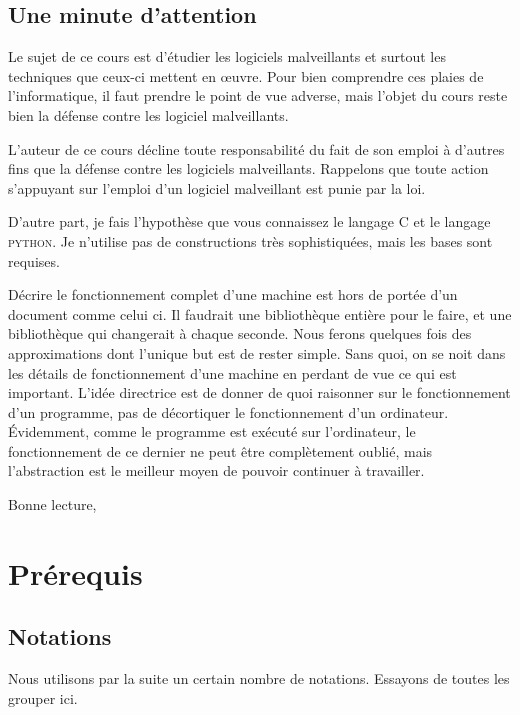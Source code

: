 \documentclass{book}
\newcommand{\python}{\textsc{python}\xspace}
\newcommand{\C}{\textsc{C}\xspace}
\begin{document}
	
\section*{Une minute d'attention}

Le sujet de ce cours est d'étudier les logiciels malveillants et surtout les techniques que ceux-ci mettent en \oe uvre. Pour bien comprendre ces plaies de l'informatique, il faut prendre le point de vue adverse, mais l'objet du cours reste bien la défense contre les logiciel malveillants. 

L'auteur de ce cours décline toute responsabilité du fait de son emploi à d'autres fins que la défense contre les logiciels malveillants. Rappelons que toute action s'appuyant sur l'emploi d'un logiciel malveillant est punie par la loi. 

D'autre part, je fais l'hypothèse que vous connaissez le langage \C et le langage \python. Je n'utilise pas de constructions très sophistiquées, mais les bases sont requises.

Décrire le fonctionnement complet d'une machine est hors de portée d'un document comme celui ci. Il faudrait une bibliothèque entière pour le faire, et une bibliothèque qui changerait à chaque seconde. Nous ferons  quelques fois des approximations dont l'unique but est de rester simple. Sans quoi, on se noit dans les détails de fonctionnement d'une machine en perdant de vue ce qui est important. L'idée directrice est de donner de quoi raisonner sur le fonctionnement d'un programme, pas de décortiquer le fonctionnement d'un ordinateur. \'Evidemment, comme le programme est exécuté sur l'ordinateur, le fonctionnement de ce dernier ne peut être complètement oublié, mais l'abstraction est le meilleur moyen de pouvoir continuer à travailler.

\medskip
Bonne lecture,

\chapter{Prérequis}

\section{Notations} \label{sec:notations}

Nous utilisons par la suite un certain nombre de notations. Essayons de toutes les grouper ici.

\end{document}
